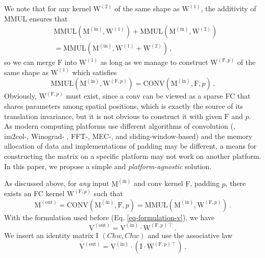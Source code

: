 \documentclass[10pt,twocolumn,letterpaper]{article}
\begin{document}
We note that for any kernel $\mathrm{W}^{(2)}$ of the same shape as $\mathrm{W}^{(1)}$, the additivity of MMUL ensures that
\begin{equation}
\begin{aligned}
&\text{MMUL}(\mathrm{M}^{(\text{in})}, \mathrm{W}^{(1)}) + \text{MMUL}(\mathrm{M}^{(\text{in})}, \mathrm{W}^{(2)}) \\
&= \text{MMUL}(\mathrm{M}^{(\text{in})}, \mathrm{W}^{(1)} + \mathrm{W}^{(2)}) \,,
\end{aligned}
\end{equation}
so we can merge $\mathrm{F}$ into $\mathrm{W}^{(1)}$ as long as we manage to construct $\mathrm{W}^{(\mathrm{F},p)}$ of the same shape as $\mathrm{W}^{(1)}$ which satisfies
\begin{equation}
	\text{MMUL}(\mathrm{M}^{(\text{in})}, \mathrm{W}^{(\mathrm{F},p)}) = \text{CONV}(\mathrm{M}^{(\text{in})},\mathrm{F},p) \,.
\end{equation}
Obviously, $\mathrm{W}^{(\mathrm{F},p)}$ must exist, since a conv can be viewed as a sparse FC that shares parameters among spatial positions, which is exactly the source of its translation invariance, but it is not obvious to construct it with given $\mathrm{F}$ and $p$. As modern computing platforms use different algorithms of convolution (\eg, im2col-\cite{im2col}, Winograd- \cite{winograd}, FFT-\cite{fft-conv}, MEC-\cite{cho2017mec}, and sliding-window-based) and the memory allocation of data and implementations of padding may be different, a means for constructing the matrix on a specific platform may not work on another platform. In this paper, we propose a simple and \textit{platform-agnostic} solution.

As discussed above, for \textit{any} input $\mathrm{M}^{(\text{in})}$ and conv kernel $\mathrm{F}$, padding $p$, there exists an FC kernel $\mathrm{W}^{(\mathrm{F},p)}$ such that
\begin{equation}
	\mathrm{M}^{(\text{out})} = \text{CONV}(\mathrm{M}^{(\text{in})}, \mathrm{F}, p) = \text{MMUL}(\mathrm{M}^{(\text{in})}, \mathrm{W}^{(\mathrm{F},p)}) \,.
\end{equation}
With the formulation used before (Eq. \ref{eq-formulation-v}), we have
\begin{equation}\label{eq-middle}
	\mathrm{V}^{(\text{out})} = \mathrm{V}^{(\text{in})}\cdot\mathrm{W}^{(\mathrm{F},p)\intercal} \,.
\end{equation}
We insert an identity matrix $\mathrm{I}$ $(Chw, Chw)$ and use the associative law
\begin{equation}
	\mathrm{V}^{(\text{out})} = \mathrm{V}^{(\text{in})}\cdot (\mathrm{I} \cdot \mathrm{W}^{(\mathrm{F},p)\intercal}) \,.
\end{equation}
\end{document}
